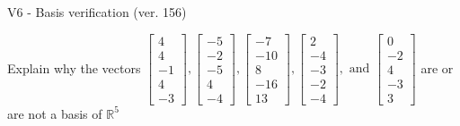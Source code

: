 \begin{exercise}
  \begin{exerciseTitle}V6 - Basis verification (ver. 156)\end{exerciseTitle}
  \begin{exerciseStatement}
    Explain why the vectors \(\left[\begin{array}{r}
4 \\
4 \\
-1 \\
4 \\
-3
\end{array}\right] , \left[\begin{array}{r}
-5 \\
-2 \\
-5 \\
4 \\
-4
\end{array}\right] , \left[\begin{array}{r}
-7 \\
-10 \\
8 \\
-16 \\
13
\end{array}\right] , \left[\begin{array}{r}
2 \\
-4 \\
-3 \\
-2 \\
-4
\end{array}\right] , \text{ and } \left[\begin{array}{r}
0 \\
-2 \\
4 \\
-3 \\
3
\end{array}\right]\) are or are not a basis of \(\mathbb{R}^5\)	



\end{exerciseStatement}
\end{exercise}
